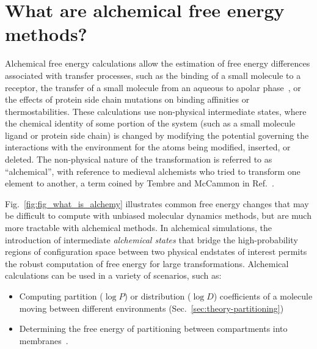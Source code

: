 \documentclass[9pt,bestpractices]{livecoms}
\begin{document}
\section{What are alchemical free energy methods?}
\label{sec:intro}
Alchemical free energy calculations allow the estimation of free energy differences associated with transfer processes, such as the binding of a small molecule to a receptor, the transfer of a small molecule from an aqueous to apolar phase~\cite{zwanzig1954hightemperature}, or the effects of protein side chain mutations on binding affinities or thermostabilities. 
These calculations use non-physical intermediate states, where the chemical identity of some portion of the system (such as a small molecule ligand or protein side chain) is changed by modifying the potential governing the interactions with the environment for the atoms being modified, inserted, or deleted. The non-physical nature of the transformation is referred to as ``alchemical'', with reference to medieval alchemists who tried to transform one element to another, a term coined by Tembre and McCammon in Ref.~\cite{tembre1984ligandreceptor}.

Fig.~\ref{fig:fig_what_is_alchemy} illustrates common free energy changes that may be difficult to compute with unbiased molecular dynamics methods, but are much more tractable with alchemical methods.
In alchemical simulations, the introduction of intermediate \textit{alchemical states} that bridge the high-probability regions of configuration space between two physical endstates of interest permits the robust computation of free energy for large transformations.
Alchemical calculations can be used in a variety of scenarios, such as: 
\begin{itemize}
\item Computing partition ($\log P$) or distribution ($\log D$) coefficients of a molecule moving between different environments (Sec.~\ref{sec:theory-partitioning})~\cite{rustenburg2016measuring, bosisio2016blinded} 
\item Determining the free energy of partitioning between compartments into membranes~\cite{corey2019insights}. 
\end{itemize}
\end{document}
